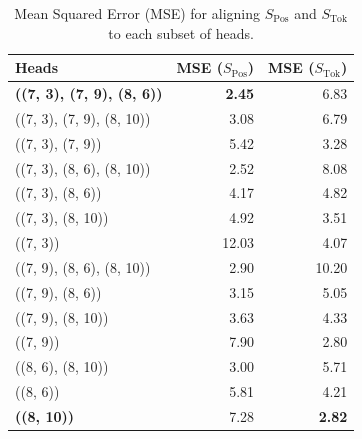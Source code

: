 \documentclass{article}
\theoremstyle{plain}
\theoremstyle{definition}
\theoremstyle{remark}
\newcommand{\token}{S_{\text{Tok}}}
\newcommand{\position}{S_{\text{Pos}}}
\begin{document}
\begin{table}
\centering
\caption{Mean Squared Error (MSE) for aligning $\position$ and $\token$ to each subset of heads.}
\begin{tabular}{lrr}
\toprule
\textbf{Heads} & \textbf{MSE ($\position$)} & \textbf{MSE ($\token$)} \\
\midrule
\textbf{((7, 3), (7, 9), (8, 6))} & \textbf{2.45} & 6.83 \\
((7, 3), (7, 9), (8, 10)) & 3.08 &6.79  \\
((7, 3), (7, 9)) & 5.42 & 3.28 \\
((7, 3), (8, 6), (8, 10)) & 2.52 & 8.08  \\
((7, 3), (8, 6)) & 4.17 & 4.82 \\
((7, 3), (8, 10)) & 4.92  & 3.51 \\
((7, 3)) & 12.03 & 4.07 \\
((7, 9), (8, 6), (8, 10)) & 2.90 & 10.20 \\
((7, 9), (8, 6)) & 3.15 & 5.05 \\
{((7, 9), (8, 10))} & 3.63 & 4.33 \\
{((7, 9))} & 7.90 & {2.80} \\
((8, 6), (8, 10)) & 3.00  & 5.71  \\
((8, 6)) & 5.81 & 4.21 \\
\textbf{((8, 10))} & 7.28 & \textbf{2.82} \\
\bottomrule
\end{tabular}
\label{tab:appendix-ioi-mse-accuracy}
\end{table}
\end{document}
